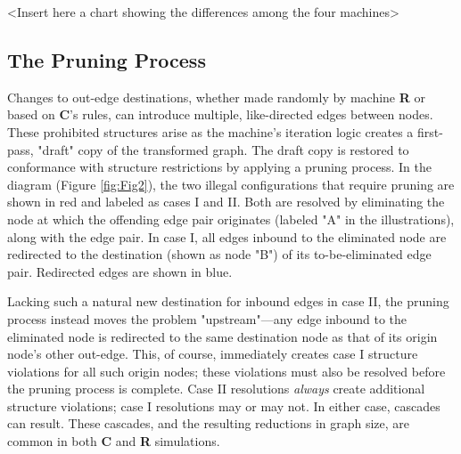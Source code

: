 \documentclass[twoside,twocolumn]{article}
\begin{document}
<Insert here a chart showing the differences among the four machines>

\subsection{The Pruning Process}

Changes to out-edge destinations, whether made randomly by machine \textbf{R} or based on \textbf{C}'s
rules, can introduce multiple, like-directed edges between nodes. These prohibited structures
arise as the machine's iteration logic creates a first-pass, "draft" copy of the transformed graph.
The draft copy is restored to conformance with structure restrictions by applying a
pruning process. In the diagram (Figure \ref{fig:Fig2}),
the two illegal configurations that require pruning are shown in red and
labeled as cases I and II.
Both are resolved by eliminating the node at which the offending edge pair
originates (labeled "A" in the illustrations), along with the edge pair.
In case I, all edges inbound to the eliminated node are redirected to 
the destination (shown as node "B") of its to-be-eliminated edge pair.
Redirected edges are shown in blue.

Lacking such a natural new destination for inbound edges in case II, the
pruning process instead moves the problem "upstream"---any edge inbound to
the eliminated node is redirected to the same destination node as that of
its origin node's other out-edge. This, of course, immediately creates
case I structure violations for all such origin nodes; these violations must also be
resolved before the pruning process is complete.
Case II resolutions \textit{always} create additional structure violations;
case I resolutions may or may not. In either case, cascades can result. These
cascades, and the resulting reductions in graph size, are common in both
\textbf{C} and \textbf{R} simulations.
\end{document}
